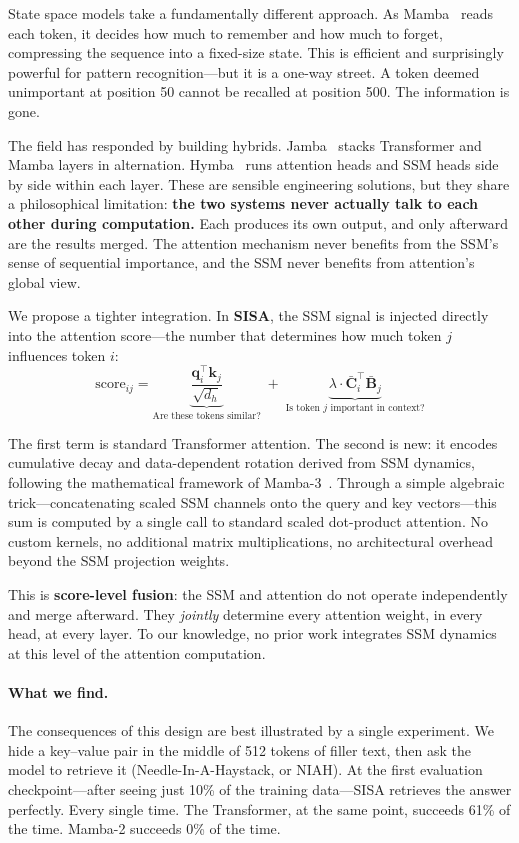 \documentclass[11pt]{article}
\begin{document}
State space models take a fundamentally different approach. As Mamba~\citep{gu2023mamba} reads each token, it decides how much to remember and how much to forget, compressing the sequence into a fixed-size state. This is efficient and surprisingly powerful for pattern recognition---but it is a one-way street. A token deemed unimportant at position 50 cannot be recalled at position 500. The information is gone.

The field has responded by building hybrids. Jamba~\citep{jamba} stacks Transformer and Mamba layers in alternation. Hymba~\citep{hymba} runs attention heads and SSM heads side by side within each layer. These are sensible engineering solutions, but they share a philosophical limitation: \textbf{the two systems never actually talk to each other during computation.} Each produces its own output, and only afterward are the results merged. The attention mechanism never benefits from the SSM's sense of sequential importance, and the SSM never benefits from attention's global view.

We propose a tighter integration. In \textbf{SISA}, the SSM signal is injected directly into the attention score---the number that determines how much token $j$ influences token $i$:
\begin{equation}
\text{score}_{ij} = \underbrace{\frac{\mathbf{q}_i^\top \mathbf{k}_j}{\sqrt{d_h}}}_{\text{Are these tokens similar?}} \;+\; \underbrace{\lambda \cdot \bar{\mathbf{C}}_i^\top \bar{\mathbf{B}}_j}_{\text{Is token $j$ important in context?}}
\label{eq:sisa_main}
\end{equation}

The first term is standard Transformer attention. The second is new: it encodes cumulative decay and data-dependent rotation derived from SSM dynamics, following the mathematical framework of Mamba-3~\citep{mamba3}. Through a simple algebraic trick---concatenating scaled SSM channels onto the query and key vectors---this sum is computed by a single call to standard scaled dot-product attention. No custom kernels, no additional matrix multiplications, no architectural overhead beyond the SSM projection weights.

This is \textbf{score-level fusion}: the SSM and attention do not operate independently and merge afterward. They \emph{jointly} determine every attention weight, in every head, at every layer. To our knowledge, no prior work integrates SSM dynamics at this level of the attention computation.

\paragraph{What we find.} The consequences of this design are best illustrated by a single experiment. We hide a key--value pair in the middle of 512 tokens of filler text, then ask the model to retrieve it (Needle-In-A-Haystack, or NIAH). At the first evaluation checkpoint---after seeing just 10\% of the training data---SISA retrieves the answer perfectly. Every single time. The Transformer, at the same point, succeeds 61\% of the time. Mamba-2 succeeds 0\% of the time.
\end{document}

